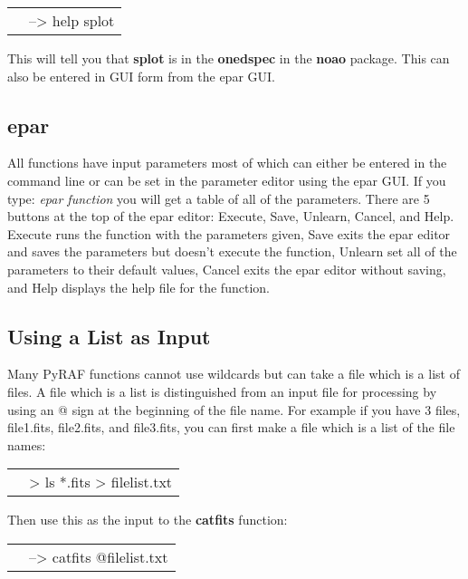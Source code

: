 \begin{minipage}{4in}
\setlength{\oddsidemargin}{0.25 in}
\setlength{\evensidemargin}{0.25 in}
\begin{tabular}{ll}
& {\color{RoyalBlue}--> help splot}
\end{tabular}
\end{minipage}

This will tell you that {\bf splot} is in the {\bf onedspec} in the {\bf noao} package. This can also be entered in GUI form from the epar GUI. 

\subsection{epar}
All functions have input parameters most of which can either be entered in the command line or can be set in the parameter editor using the epar GUI. If you type: \emph{epar function} you will get a table of all of the parameters. There are 5 buttons at the top of the epar editor: Execute, Save, Unlearn, Cancel, and Help. Execute runs the function with the parameters given, Save exits the epar editor and saves the parameters but doesn't execute the function, Unlearn set all of the parameters to their default values, Cancel exits the epar editor without saving, and Help displays the help file for the function. 

\subsection{Using a List as Input}
Many PyRAF functions cannot use wildcards but can take a file which is a list of files. A file which is a list is distinguished from an input file for processing by using an @ sign at the beginning of the file name. For example if you have 3 files, file1.fits, file2.fits, and file3.fits, you can first make a file which is a list of the file names:

\begin{minipage}{4in}
\setlength{\oddsidemargin}{0.25 in}
\setlength{\evensidemargin}{0.25 in}
\begin{tabular}{ll}
& {\color{RoyalBlue}> ls *.fits > filelist.txt } \\
\end{tabular}


Then use this as the input to the {\bf catfits} function: \\
\begin{tabular}{ll}
& {\color{RoyalBlue}--> catfits @filelist.txt } \\
\end{tabular}
\end{minipage}


